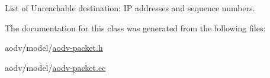 List of Unreachable destination\+: IP addresses and sequence numbers. 



The documentation for this class was generated from the following files\+:\begin{DoxyCompactItemize}
\item 
aodv/model/\hyperlink{aodv-packet_8h}{aodv-\/packet.\+h}\item 
aodv/model/\hyperlink{aodv-packet_8cc}{aodv-\/packet.\+cc}\end{DoxyCompactItemize}
